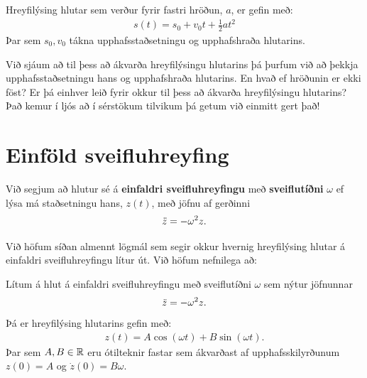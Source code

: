 \begin{tcolorbox}
\begin{theorem}
Hreyfilýsing hlutar sem verður fyrir fastri hröðun, $a$, er gefin með:
\begin{align*}
    s(t) = s_0 + v_0 t + \frac{1}{2} at^2
\end{align*}
Þar sem $s_0, v_0$ tákna upphafsstaðsetningu og upphafshraða hlutarins.
\end{theorem}
\end{tcolorbox}

Við sjáum að til þess að ákvarða hreyfilýsingu hlutarins þá þurfum við að þekkja upphafsstaðsetningu hans og upphafshraða hlutarins. En hvað ef hröðunin er ekki föst? Er þá einhver leið fyrir okkur til þess að ákvarða hreyfilýsingu hlutarins? Það kemur í ljós að í sérstökum tilvikum þá getum við einmitt gert það!

\newpage

\section{Einföld sveifluhreyfing}

\begin{tcolorbox}
\begin{definition}
Við segjum að hlutur sé á \textbf{einfaldri sveifluhreyfingu} með \textbf{sveiflutíðni} $\omega$ ef lýsa má staðsetningu hans, $z(t)$, með jöfnu af gerðinni
\begin{align*}
    \Ddot{z} = -\omega^2 z.
\end{align*}
\end{definition}
\end{tcolorbox}

Við höfum síðan almennt lögmál sem segir okkur hvernig hreyfilýsing hlutar á einfaldri sveifluhreyfingu lítur út. Við höfum nefnilega að:

\begin{tcolorbox}
\begin{setning} \label{regla:einfold-sveifla}
Lítum á hlut á einfaldri sveifluhreyfingu með sveiflutíðni $\omega$ sem nýtur jöfnunnar
\begin{align*}
    \Ddot{z} = -\omega^2 z.
\end{align*}
Þá er hreyfilýsing hlutarins gefin með:
\begin{align*}
z(t) = A\cos(\omega t) + B\sin(\omega t).
\end{align*}
Þar sem $A,B \in \mathbb{R}$ eru ótilteknir fastar sem ákvarðast af upphafsskilyrðunum $z(0) = A$ og $\dot{z}(0) = B\omega$.
\end{setning}
\end{tcolorbox}

